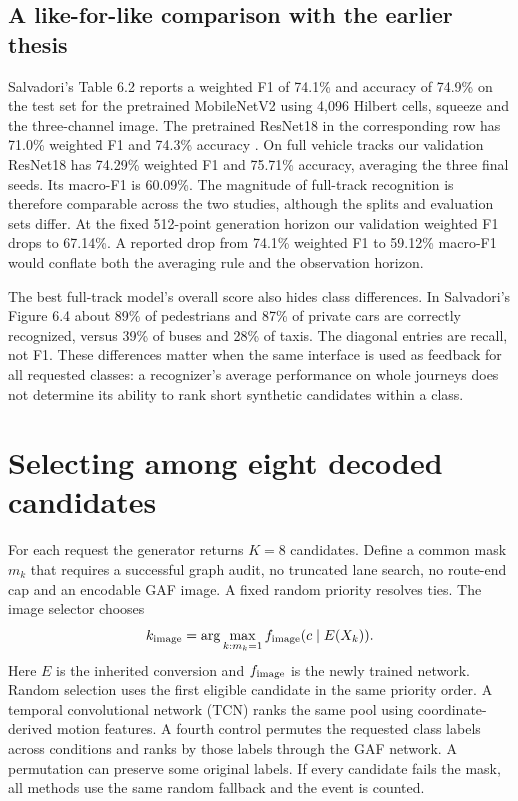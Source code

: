 \subsection{A like-for-like comparison with the earlier thesis}
Salvadori's Table 6.2 reports a weighted F1 of 74.1\% and accuracy of 74.9\% on the test set for the pretrained MobileNetV2 using 4,096 Hilbert cells, squeeze and the three-channel image. The pretrained ResNet18 in the corresponding row has 71.0\% weighted F1 and 74.3\% accuracy \cite{salvadori}. On full vehicle tracks our validation ResNet18 has 74.29\% weighted F1 and 75.71\% accuracy, averaging the three final seeds. Its macro-F1 is 60.09\%. The magnitude of full-track recognition is therefore comparable across the two studies, although the splits and evaluation sets differ. At the fixed 512-point generation horizon our validation weighted F1 drops to 67.14\%. A reported drop from 74.1\% weighted F1 to 59.12\% macro-F1 would conflate both the averaging rule and the observation horizon.

The best full-track model's overall score also hides class differences. In Salvadori's Figure 6.4 about 89\% of pedestrians and 87\% of private cars are correctly recognized, versus 39\% of buses and 28\% of taxis. The diagonal entries are recall, not F1. These differences matter when the same interface is used as feedback for all requested classes: a recognizer's average performance on whole journeys does not determine its ability to rank short synthetic candidates within a class.

\section{Selecting among eight decoded candidates}
For each request the generator returns $K=8$ candidates. Define a common mask $m_k$ that requires a successful graph audit, no truncated lane search, no route-end cap and an encodable GAF image. A fixed random priority resolves ties. The image selector chooses
\begin{equation}
 k_{\rm image}=\arg\max_{k:m_k=1} f_{\rm image}(c\mid E(X_k)).
\end{equation}
Here $E$ is the inherited conversion and $f_{\rm image}$ is the newly trained network. Random selection uses the first eligible candidate in the same priority order. A temporal convolutional network (TCN) ranks the same pool using coordinate-derived motion features. A fourth control permutes the requested class labels across conditions and ranks by those labels through the GAF network. A permutation can preserve some original labels. If every candidate fails the mask, all methods use the same random fallback and the event is counted.

